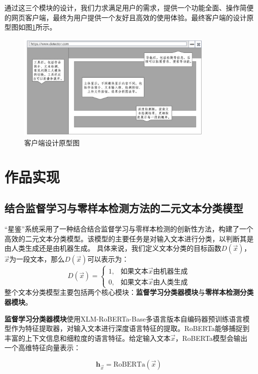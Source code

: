 \documentclass[a4paper]{report}
\begin{document}
通过这三个模块的设计，我们力求满足用户的需求，提供一个功能全面、操作简便的网页客户端，最终为用户提供一个友好且高效的使用体验。最终客户端的设计原型图如图\ref{fig:Web_model}所示。
\begin{figure}[H]
	\centering
	\includegraphics[width=0.85\textwidth]{figures/Web_model.png}
	\caption{客户端设计原型图}
	\label{fig:Web_model}
\end{figure}
\chapter{作品实现}

\section{结合监督学习与零样本检测方法的二元文本分类模型}
“星鉴”系统采用了一种结合结合监督学习与零样本检测的创新性方法，构建了一个高效的二元文本分类模型。该模型的主要任务是对输入文本进行分类，以判断其是由人类生成还是由机器生成。
具体来说，我们定义文本分类的目标函数$D(\vec{x})$，$\vec{x}$为一段文本，那么$D(\vec{x})$可以表示为：
\begin{equation}
	D(\vec{x})=\begin{cases}
		1, & \text{如果文本$\vec{x}$由机器生成} \\
		0, & \text{如果文本$\vec{x}$由人类生成}
	\end{cases}
\end{equation}
整个文本分类模型主要包括两个核心模块：\textbf{监督学习分类器模块}与\textbf{零样本检测分类器模块}。

\textbf{监督学习分类器模块}使用XLM-RoBERTa-Base多语言版本自编码器预训练语言模型作为特征提取器，对输入文本进行深度语言特征的提取。RoBERTa能够捕捉到丰富的上下文信息和细粒度的语言特征。给定输入文本$\vec{x}$，RoBERTa模型会输出一个高维特征向量表示：

\begin{equation}
	\mathbf{h}_{\vec{x}} = \text{RoBERTa}(\vec{x})
\end{equation}
\end{document}
